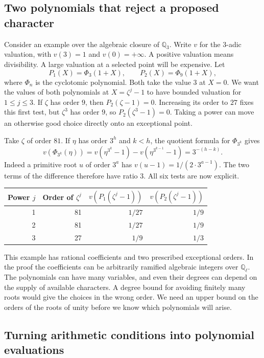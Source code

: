 \documentclass[11pt,letterpaper]{article}
\begin{document}
\subsection{Two polynomials that reject a proposed character}

Consider an example over the algebraic closure of $\mathbb Q_3$. Write $v$ for the $3$-adic valuation, with $v(3)=1$ and $v(0)=+\infty$. A positive valuation means divisibility. A large valuation at a selected point will be expensive. Let
\[
    P_1(X)=\Phi_3(1+X),\qquad P_2(X)=\Phi_9(1+X),
\]
where $\Phi_n$ is the cyclotomic polynomial. Both take the value $3$ at $X=0$. We want the values of both polynomials at $X=\zeta^j-1$ to have bounded valuation for $1\le j\le3$. If $\zeta$ has order $9$, then $P_2(\zeta-1)=0$. Increasing its order to $27$ fixes this first test, but $\zeta^3$ has order $9$, so $P_2(\zeta^3-1)=0$. Taking a power can move an otherwise good choice directly onto an exceptional point.

Take $\zeta$ of order $81$. If $\eta$ has order $3^h$ and $k<h$, the quotient formula for $\Phi_{3^k}$ gives
\[
 v(\Phi_{3^k}(\eta))
 =v(\eta^{3^k}-1)-v(\eta^{3^{k-1}}-1)=3^{-(h-k)}.
\]
Indeed a primitive root $u$ of order $3^a$ has $v(u-1)=1/(2\cdot3^{a-1})$. The two terms of the difference therefore have ratio $3$. All six tests are now explicit.

\begin{center}
\begin{tabular}{@{}rrrr@{}}\toprule
Power $j$ & Order of $\zeta^j$ & $v(P_1(\zeta^j-1))$ & $v(P_2(\zeta^j-1))$\\ \midrule
1 & 81 & $1/27$ & $1/9$\\
2 & 81 & $1/27$ & $1/9$\\
3 & 27 & $1/9$ & $1/3$\\ \bottomrule
\end{tabular}
\end{center}
This example has rational coefficients and two prescribed exceptional orders. In the proof the coefficients can be arbitrarily ramified algebraic integers over $\mathbb Q_\ell$. The polynomials can have many variables, and even their degrees can depend on the supply of available characters. A degree bound for avoiding finitely many roots would give the choices in the wrong order. We need an upper bound on the orders of the roots of unity before we know which polynomials will arise.

\subsection{Turning arithmetic conditions into polynomial evaluations}
\end{document}
